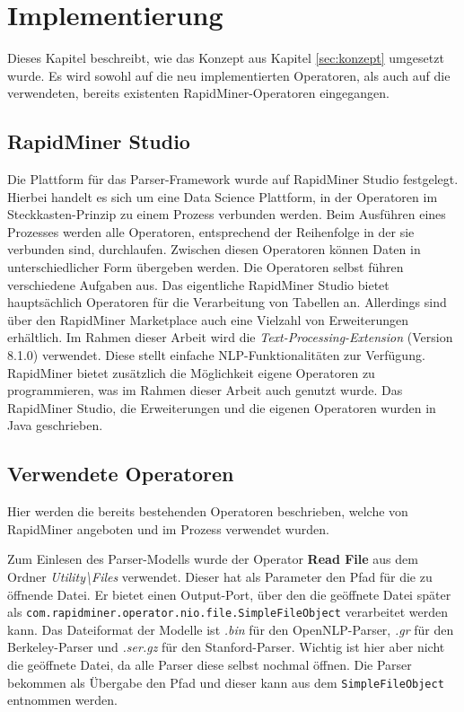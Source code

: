 %
\chapter{Implementierung}
\label{sec:impl}
Dieses Kapitel beschreibt, wie das Konzept aus Kapitel \ref{sec:konzept} umgesetzt wurde. Es wird sowohl auf die neu implementierten Operatoren, als auch auf die verwendeten, bereits existenten RapidMiner-Operatoren eingegangen. 

\section{RapidMiner Studio}
\label{sec:impl:rms}

Die Plattform für das Parser-Framework wurde auf RapidMiner Studio \cite{rmstudio} festgelegt. Hierbei handelt es sich um eine Data Science Plattform, in der Operatoren im Steckkasten-Prinzip zu einem Prozess verbunden werden. Beim Ausführen eines Prozesses werden alle Operatoren, entsprechend der Reihenfolge in der sie verbunden sind, durchlaufen. Zwischen diesen Operatoren können Daten in unterschiedlicher Form übergeben werden. Die Operatoren selbst führen verschiedene Aufgaben aus. Das eigentliche RapidMiner Studio bietet hauptsächlich Operatoren für die Verarbeitung von Tabellen an. Allerdings sind über den RapidMiner Marketplace auch eine Vielzahl von Erweiterungen erhältlich. Im Rahmen dieser Arbeit wird die \textit{Text-Processing-Extension} (Version 8.1.0) \cite{textExt} verwendet. Diese stellt einfache NLP-Funktionalitäten zur Verfügung. RapidMiner bietet zusätzlich die Möglichkeit eigene Operatoren zu programmieren, was im Rahmen dieser Arbeit auch genutzt wurde. Das RapidMiner Studio, die Erweiterungen und die eigenen Operatoren wurden in Java geschrieben. \\

\section{Verwendete Operatoren}
\label{sec:impl:vwo}

Hier werden die bereits bestehenden Operatoren beschrieben, welche von RapidMiner angeboten und im Prozess verwendet wurden.

Zum Einlesen des Parser-Modells wurde der Operator \textbf{Read File} aus dem Ordner \textit{Utility\textbackslash Files} verwendet. Dieser hat als Parameter den Pfad für die zu öffnende Datei. Er bietet einen Output-Port, über den die geöffnete Datei später als \texttt{com.rapidminer.operator.nio.file.SimpleFileObject} verarbeitet werden kann. Das Dateiformat der Modelle ist \textit{.bin} für den OpenNLP-Parser, \textit{.gr} für den Berkeley-Parser und \textit{.ser.gz} für den Stanford-Parser. Wichtig ist hier aber nicht die geöffnete Datei, da alle Parser diese selbst nochmal öffnen. Die Parser bekommen als Übergabe den Pfad und dieser kann aus dem \texttt{SimpleFileObject} entnommen werden.


